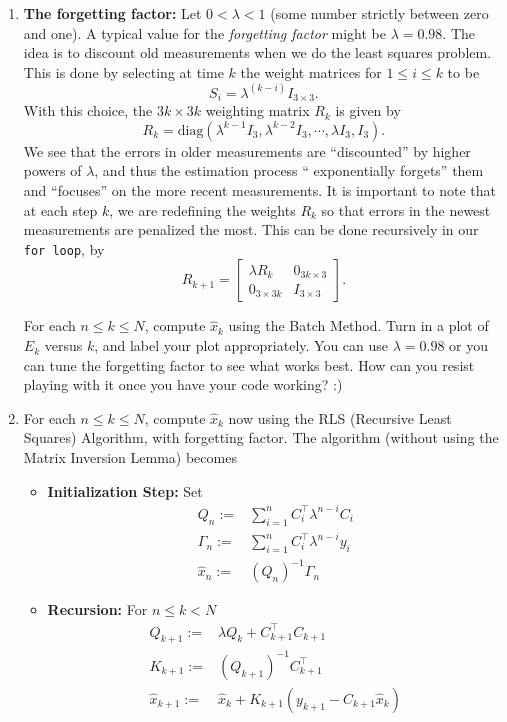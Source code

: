 \documentclass[letterpaper]{article}
\begin{document}
\begin{enumerate}
\begin{enumerate}
\item \textbf{The forgetting factor:}  Let $0 < \lambda < 1$ (some number strictly between zero and one). A typical value for the \textit{forgetting factor} might be $\lambda = 0.98$. The idea is to discount old measurements when we do the least squares problem. This is done by selecting at time $k$ the weight matrices for $1 \le i \le k$  to be
    $$S_i= \lambda^{(k-i)}I_{3 \times 3}.$$ With this choice, the $3k \times 3k$  weighting matrix $R_k$ is given by
    $$R_k = \mathrm{diag} (\lambda^{k-1} I_3, \lambda^{k-2} I_3, \cdots, \lambda I_3, I_3).$$
    We see that the errors in older measurements are ``discounted''  by higher powers of $\lambda$, and thus the estimation process `` exponentially forgets'' them and  ``focuses'' on the more recent measurements.
It is important to note that at each step $k$, we are redefining the weights $R_k$ so that errors in the newest measurements are penalized the most. This can be done recursively in our \texttt{for loop}, by
    $$R_{k+1} = \left[ \begin{array}{cc} \lambda R_k & 0_{3k \times 3} \\ 0_{3 \times 3 k} & I_{3 \times 3} \end{array} \right].$$


For each $n \le k \le N$, compute $ \hat{x}_k $ using the Batch Method. Turn in a plot of $E_k$ versus $k$, and label your plot appropriately. You can use $\lambda = 0.98$ or you
can tune the forgetting factor to see what works best. How can you resist playing with it once you have your code working? :)

    \item For each $n \le k \le N$, compute $ \hat{x}_k $ now using the RLS (Recursive Least Squares) Algorithm, with forgetting factor. The algorithm (without using the Matrix Inversion Lemma) becomes
        \begin{itemize}
        \item \textbf{Initialization Step:} Set
        \begin{align*}
        Q_n:=&\sum_{i=1}^n C_i^\top \lambda^{n-i} C_i \\
        \Gamma_n:=&\sum_{i=1}^n C_i^\top \lambda^{n-i} y_i \\
        \hat{x}_n:=& (Q_n)^{-1} \Gamma_n
        \end{align*}


        \item \textbf{Recursion:} For $n \le k < N$
        \begin{align*}
        Q_{k+1}:=& \lambda Q_k + C_{k+1}^\top C_{k+1}\\
        K_{k+1}:= & (Q_{k+1})^{-1} C_{k+1}^\top \\
         \hat{x}_{k+1}:=&   \hat{x}_{k} + K_{k+1} \left( y_{k+1} - C_{k+1} \hat{x}_{k}  \right)
        \end{align*}


\end{itemize}
\end{enumerate}
\end{enumerate}
\end{document}
